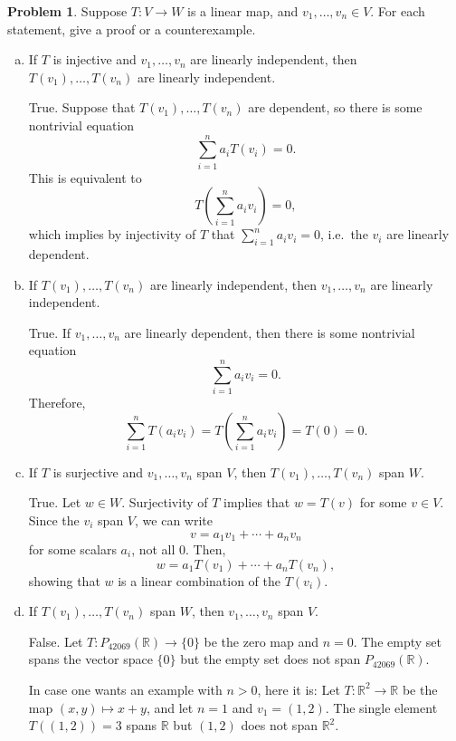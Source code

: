\documentclass[11pt,oneside]{amsart}
\theoremstyle{definition}
\newtheorem{problem}{Problem}
\newcommand{\bR}{\mathbb{R}}
\begin{document}
    \begin{problem}
        Suppose $T\colon V\to W$ is a linear map, and $v_1,\dots,v_n\in V$. For each statement, give a proof or a counterexample.
        \begin{enumerate}[(a)]
            \item If $T$ is injective and $v_1,\dots,v_n$ are linearly independent, then $T(v_1),\dots,T(v_n)$ are linearly independent.
            \begin{solution}
                True. Suppose that $T(v_1),\dots,T(v_n)$ are dependent, so there is some nontrivial equation
                \[\sum_{i=1}^n a_i T(v_i)=0.\]
                This is equivalent to
                \[T\left(\sum_{i=1}^n a_iv_i\right)=0,\]
                which implies by injectivity of $T$ that $\sum_{i=1}^n a_iv_i=0$, i.e.\ the $v_i$ are linearly dependent.
            \end{solution}
            \item If $T(v_1),\dots,T(v_n)$ are linearly independent, then $v_1,\dots,v_n$ are linearly independent.
            \begin{solution}
                True. If $v_1,\dots,v_n$ are linearly dependent, then there is some nontrivial equation
                \[\sum_{i=1}^n a_iv_i=0.\]
                Therefore,
                \[\sum_{i=1}^n T(a_iv_i)=T\left( \sum_{i=1}^n a_iv_i \right)=T(0)=0.\]
            \end{solution}
            \item If $T$ is surjective and $v_1,\dots,v_n$ span $V$, then $T(v_1),\dots,T(v_n)$ span $W$.
            \begin{solution}
                True. Let $w\in W$. Surjectivity of $T$ implies that $w=T(v)$ for some $v\in V$. Since the $v_i$ span $V$, we can write
                \[v=a_1v_1+\cdots+a_nv_n\]
                for some scalars $a_i$, not all 0. Then,
                \[w=a_1T(v_1)+\cdots+a_nT(v_n),\]
                showing that $w$ is a linear combination of the $T(v_i)$.
            \end{solution}
            \item If $T(v_1),\dots,T(v_n)$ span $W$, then $v_1,\dots,v_n$ span $V$.
            \begin{solution}
                False. Let $T\colon P_{42069}(\bR)\to \{0\}$ be the zero map and $n=0$. The empty set spans the vector space $\{0\}$ but the empty set does not span $P_{42069}(\bR)$.

                In case one wants an example with $n>0$, here it is: Let $T\colon \bR^2\to\bR$ be the map $(x,y)\mapsto x+y$, and let $n=1$ and $v_1=(1,2)$. The single element $T((1,2))=3$ spans $\bR$ but $(1,2)$ does not span $\bR^2$.
            \end{solution}
        \end{enumerate}
    \end{problem}
\end{document}
